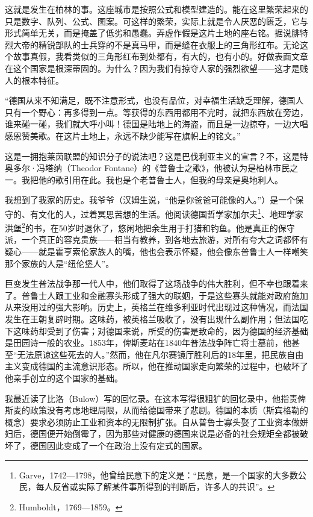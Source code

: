 \documentclass[UTF8]{ctexart}
\begin{document}
这就是发生在柏林的事。这座城市是按照公式和模型建造的。能在这里繁荣起来的只是数字、队列、公式、图案。可这样的繁荣，实际上就是令人厌恶的匮乏，它与形式简单无关，而是掩盖了低劣和愚蠢。弄虚作假是这片土地的座右铭。据说腓特烈大帝的精锐部队的士兵穿的不是真马甲，而是缝在衣服上的三角形红布。无论这个故事真假，我看类似的三角形红布到处都有，有大的，也有小的。好做表面文章在这个国家是根深蒂固的。为什么？因为我们有掠夺人家的强烈欲望——这才是贱人的根本特征。

“德国从来不知满足，既不注意形式，也没有品位，对幸福生活缺乏理解，德国人只有一个野心：再多得到一点。等获得的东西用都用不完时，就把东西放在旁边，谁来碰一碰，我们就大呼小叫！德国是陆地上的海盗，而且是一边掠夺，一边大唱感恩赞美歌。在这片土地上，永远不缺少能写在旗帜上的铭文。”

这是一拥抱莱茵联盟的知识分子的说法吧？这是巴伐利亚主义的宣言？不，这是特奥多尔·冯塔纳（Theodor Fontane）的《普鲁士之歌》，他被认为是柏林市民之一。我把他的歌引用在此。我也是个老普鲁士人，但我的母亲是奥地利人。

我想到了我家的历史。我爷爷（汉姆生说，“他是你爸爸可能像的人。”）是一个保守的、有文化的人，过着冥思苦想的生活。他阅读德国哲学家加尔夫\footnote{Garve，1742—1798，他曾给民意下的定义是：“民意，是一个国家的大多数公民，每人反省或实际了解某件事所得到的判断后，许多人的共识”。}、地理学家洪堡\footnote{Humboldt，1769—1859。}的书，在50岁时退休了，悠闲地把余生用于打猎和钓鱼。他是真正的保守派，一个真正的容克贵族——相当有教养，到各地去旅游，对所有夸大之词都怀有疑心——就是霍亨索伦家族人的嘴，他也会表示怀疑，他会像东普鲁士人一样嘲笑那个家族的人是“纽伦堡人”。

巨变发生普法战争那一代人中，他们取得了这场战争的伟大胜利，但不幸也跟着来了。普鲁士人跟工业和金融寡头形成了强大的联姻，于是这些寡头就能对政府施加从来没用过的强大影响。历史上，英格兰在维多利亚时代出现过这种情况，而法国发生在王朝复辟时期。这味药，被英格兰吸收了，没有出现什么副作用；但法国吃下这味药却受到了伤害；对德国来说，所受的伤害是致命的，因为德国的经济基础是田园诗一般的农业。1853年，俾斯麦站在1840年普法战争阵亡将士墓前，他甚至“无法原谅这些死去的人。”然而，他在凡尔赛镜厅胜利后的18年里，把民族自由主义变成德国的主流意识形态。所以，他在推动国家走向繁荣的过程中，也破坏了他亲手创立的这个国家的基础。

我最近读了比洛（Bulow）写的回忆录。在这本写得很粗犷的回忆录中，他指责俾斯麦的政策没有考虑地理局限，从而给德国带来了悲剧。德国的本质（斯宾格勒的概念）要求必须防止工业和资本的无限制扩张。自从普鲁士寡头娶了工业资本做姘妇后，德国便开始倒霉了，因为那些对健康的德国来说是必备的社会规矩全都被破坏了，德国因此变成了一个在政治上没有定式的国家。
\end{document}
